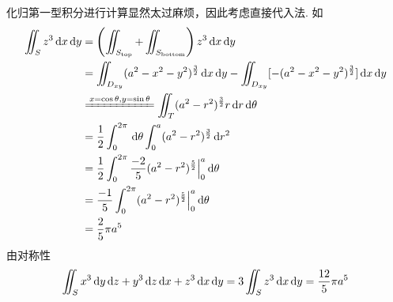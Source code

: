 \begin{analysis}
化归第一型积分进行计算显然太过麻烦，因此考虑直接代入法.
如
\[\begin{aligned}
\iint_Sz^3\diff x\diff y&=\lrp{\iint_{S_{\text{top}}}+\iint_{S_{\text{bottom}}}}z^3\diff x\diff y\\
&=\iint_{D_{xy}}(a^2-x^2-y^2)^\frac{3}{2}\diff x\diff y-\iint_{D_{xy}}[-(a^2-x^2-y^2)^\frac{3}{2}]\diff x\diff y\\
&\xlongequal{x=\cos\theta,y=\sin\theta}\iint_{T}(a^2-r^2)^\frac{3}{2}r\diff r\diff\theta\\
&=\frac{1}{2}\int_0^{2\pi}\diff\theta\int_0^a(a^2-r^2)^\frac{3}{2}\diff r^2\\
&=\frac{1}{2}\int_0^{2\pi}\frac{-2}{5}(a^2-r^2)^\frac{5}{2}\Big|_0^a\diff\theta\\
&=\frac{-1}{5}\int_0^{2\pi}(a^2-r^2)^\frac{5}{2}\Big|_0^a\diff\theta\\
&=\frac{2}{5}\pi a^5
\end{aligned}\]
由对称性
\[\iint_Sx^3\,\mathrm{d} y\,\mathrm{d} z+y^3\,\mathrm{d} z\,\mathrm{d} x+z^3\,\mathrm{d} x\,\mathrm{d} y=3\iint_Sz^3\,\mathrm{d} x\,\mathrm{d} y=\frac{12}{5}\pi a^5\]
\end{analysis}


